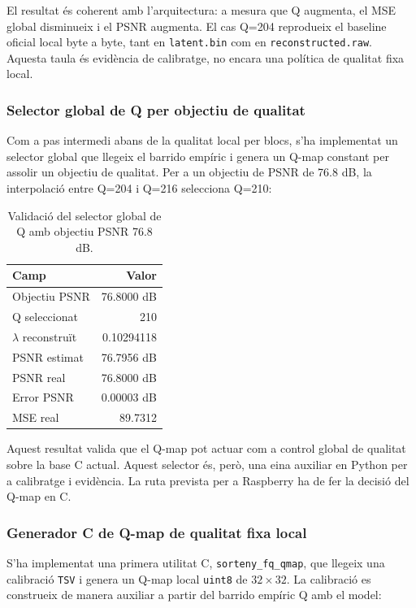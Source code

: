\documentclass[11pt,a4paper]{article}
\begin{document}
El resultat és coherent amb l'arquitectura: a mesura que Q augmenta, el MSE global disminueix i el PSNR augmenta. El cas Q=204 reprodueix el baseline oficial local byte a byte, tant en \texttt{latent.bin} com en \texttt{reconstructed.raw}. Aquesta taula és evidència de calibratge, no encara una política de qualitat fixa local.

\subsubsection{Selector global de Q per objectiu de qualitat}

Com a pas intermedi abans de la qualitat local per blocs, s'ha implementat un selector global que llegeix el barrido empíric i genera un Q-map constant per assolir un objectiu de qualitat. Per a un objectiu de PSNR de 76.8 dB, la interpolació entre Q=204 i Q=216 selecciona Q=210:

\begin{table}[H]
\centering
\begin{tabular}{l r}
\toprule
\textbf{Camp} & \textbf{Valor} \\
\midrule
Objectiu PSNR & 76.8000 dB \\
Q seleccionat & 210 \\
$\lambda$ reconstruït & 0.10294118 \\
PSNR estimat & 76.7956 dB \\
PSNR real & 76.8000 dB \\
Error PSNR & 0.00003 dB \\
MSE real & 89.7312 \\
\bottomrule
\end{tabular}
\caption{Validació del selector global de Q amb objectiu PSNR 76.8 dB.}
\end{table}

Aquest resultat valida que el Q-map pot actuar com a control global de qualitat sobre la base C actual. Aquest selector és, però, una eina auxiliar en Python per a calibratge i evidència. La ruta prevista per a Raspberry ha de fer la decisió del Q-map en C.

\subsubsection{Generador C de Q-map de qualitat fixa local}

S'ha implementat una primera utilitat C, \texttt{sorteny\_fq\_qmap}, que llegeix una calibració \texttt{TSV} i genera un Q-map local \texttt{uint8} de $32 \times 32$. La calibració es construeix de manera auxiliar a partir del barrido empíric Q amb el model:
\end{document}
